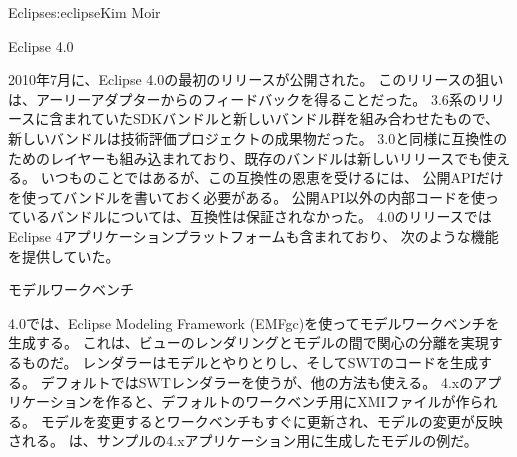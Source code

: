 \begin{aosachapter}{Eclipse}{s:eclipse}{Kim Moir}
\begin{aosasect1}{Eclipse 4.0}

2010年7月に、Eclipse 4.0の最初のリリースが公開された。
このリリースの狙いは、アーリーアダプターからのフィードバックを得ることだった。
3.6系のリリースに含まれていたSDKバンドルと新しいバンドル群を組み合わせたもので、
新しいバンドルは技術評価プロジェクトの成果物だった。
3.0と同様に互換性のためのレイヤーも組み込まれており、既存のバンドルは新しいリリースでも使える。
いつものことではあるが、この互換性の恩恵を受けるには、
公開APIだけを使ってバンドルを書いておく必要がある。
公開API以外の内部コードを使っているバンドルについては、互換性は保証されなかった。
4.0のリリースではEclipse 4アプリケーションプラットフォームも含まれており、
次のような機能を提供していた。

\begin{aosasect2}{モデルワークベンチ}

4.0では、Eclipse Modeling Framework (EMFgc)を使ってモデルワークベンチを生成する。
これは、ビューのレンダリングとモデルの間で関心の分離を実現するものだ。
レンダラーはモデルとやりとりし、そしてSWTのコードを生成する。
デフォルトではSWTレンダラーを使うが、他の方法も使える。
4.xのアプリケーションを作ると、デフォルトのワークベンチ用にXMIファイルが作られる。
モデルを変更するとワークベンチもすぐに更新され、モデルの変更が反映される。
は、サンプルの4.xアプリケーション用に生成したモデルの例だ。


\end{aosasect2}
\end{aosasect1}
\end{aosachapter}
